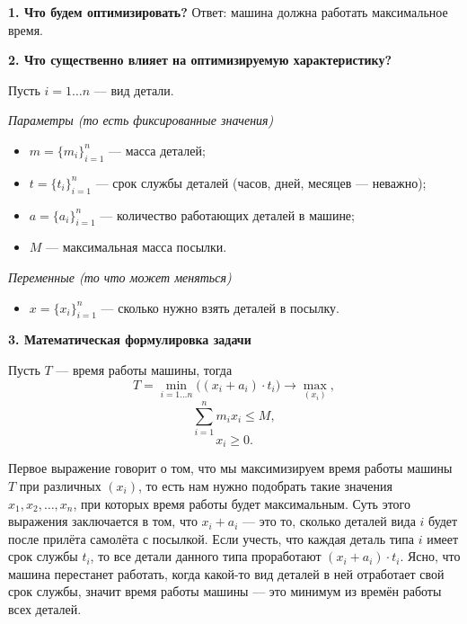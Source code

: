 \bigskip

\textbf{1. Что будем оптимизировать?} Ответ: машина должна работать максимальное время.

\bigskip

\textbf{2. Что существенно влияет на оптимизируемую характеристику?}

Пусть $i = 1 \dots n$ --- вид детали.

\bigskip

\textit{Параметры (то есть фиксированные значения)}

\begin{itemize}[nosep]
	\item $m = \{m_i\}_{i=1}^n$ --- масса деталей;
	
	\item $t = \{t_i\}_{i=1}^n$ --- срок службы деталей (часов, дней, месяцев --- неважно);

	\item $a = \{a_i\}_{i=1}^n$ --- количество работающих деталей в машине;
	
	\item $M$ --- максимальная масса посылки.
\end{itemize}

\bigskip

\textit{Переменные (то что может меняться)}

\begin{itemize}[nosep]	
	\item $x = \{x_i\}_{i=1}^n$ --- сколько нужно взять деталей в посылку.
\end{itemize}

\bigskip

\textbf{3. Математическая формулировка задачи}

Пусть $T$ --- время работы машины, тогда
\[T = \min_{i = 1 \dots n} \big((x_i + a_i) \cdot t_i\big) \to \max_{(x_i)},\]
\[\sum_{i=1}^{n} m_i x_i \le M,\]
\[x_i \ge 0.\]

Первое выражение говорит о том, что мы максимизируем время работы машины $T$ при различных $(x_i)$, то есть нам нужно подобрать такие значения $x_1, x_2, \dots, x_n$, при которых время работы будет максимальным. Суть этого выражения заключается в том, что $x_i + a_i$ --- это то, сколько деталей вида $i$ будет после прилёта самолёта с посылкой. Если учесть, что каждая деталь типа $i$ имеет срок службы $t_i$, то все детали данного типа проработают $(x_i + a_i) \cdot t_i$. Ясно, что машина перестанет работать, когда какой-то вид деталей в ней отработает свой срок службы, значит время работы машины --- это минимум из времён работы всех деталей.

